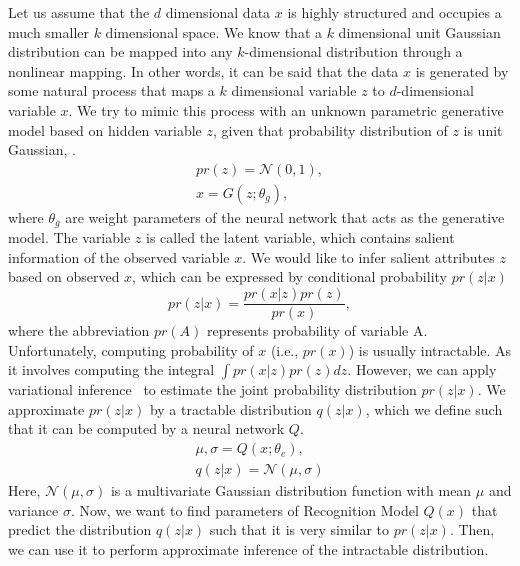 Let us assume that the $d$ dimensional data $x$ is highly structured and occupies a much smaller $k$ dimensional space.
We know that a $k$ dimensional unit Gaussian distribution can be mapped into any $k$-dimensional distribution through a nonlinear mapping.
In other words, it can be said that the data $x$ is generated by some natural process
that maps a $k$ dimensional variable $z$ to $d$-dimensional variable $x$.
We try to mimic this process with an unknown parametric generative model based on hidden variable $z$, given that probability distribution of $z$ is unit Gaussian, .
\begin{eqnarray}
pr(z) = \mathcal{N}(0, 1)\label{pz},\\
  x = G(z; \theta_g)\label{eq_G},
\end{eqnarray}
where $\theta_g$ are weight parameters of the neural network that acts as the generative model.
The variable $z$ is called the latent variable, which contains salient information of the observed variable $x$.
We would like to infer salient attributes $z$ based on observed $x$, which can be expressed by conditional probability $pr(z|x)$
\begin{equation}
pr(z|x) = \frac{pr(x|z)pr(z)}{pr(x)},
\end{equation}
where the abbreviation $pr(A)$ represents probability of variable A.
Unfortunately, computing probability of $x$ (i.e., $pr(x)$) is usually intractable. As it involves computing the integral $\int
pr(x|z)pr(z)dz.$
However, we can apply variational inference~\cite{blei2017variational} to estimate the joint probability distribution $pr(z|x)$.
We approximate $pr(z|x)$ by a tractable distribution $q(z|x)$, which we define such that it can be computed by a neural network $Q$.
\begin{eqnarray}\label{eq_Q}
\mu, \sigma = Q(x; \theta_e),\\
  q(z|x) = \mathcal{N}(\mu, \sigma)
\end{eqnarray}
Here, $\mathcal{N}(\mu, \sigma)$ is a multivariate Gaussian distribution function with mean $\mu$ and variance $\sigma$.
Now, we want to find parameters of Recognition Model $Q(x)$ that predict the distribution $q(z|x)$ such that it is very similar to $pr(z|x)$. Then, we can use it to perform approximate inference of the intractable distribution.

